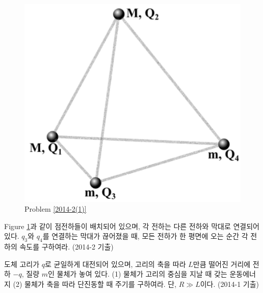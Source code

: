 \begin{problem}\label{2014-2(1)}
\begin{figure}[h]
\centering\includegraphics[scale=0.4]{Pictures/2014-2(1).PNG}
\caption{Problem \ref{2014-2(1)}}
\label{fig:2014-2(1)}
\end{figure}
Figure \ref{fig:2014-2(1)}과 같이 점전하들이 배치되어 있으며, 각 전하는 다른 전하와 막대로 연결되어 있다. $q_3$와 $q_4$를 연결하는 막대가 끊어졌을 때, 모든 전하가 한 평면에 오는 순간 각 전하의 속도를 구하여라. (2014-2 기출)
\end{problem}

\begin{problem}\label{2014-1(5)}
도체 고리가 $q$로 균일하게 대전되어 있으며, 고리의 축을 따라 $L$만큼 떨어진 거리에 전하 $-q$, 질량 $m$인 물체가 놓여 있다. (1) 물체가 고리의 중심을 지날 때 갖는 운동에너지 (2) 물체가 축을 따라 단진동할 때 주기를 구하여라. 단, $R\gg L$이다. (2014-1 기출)
\end{problem}

